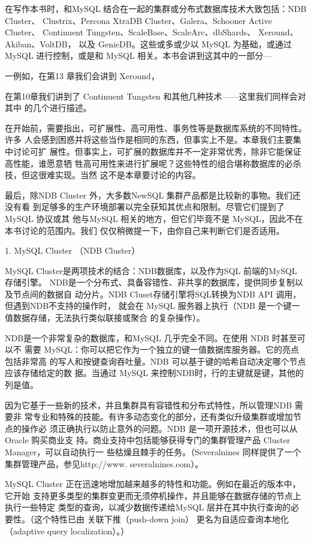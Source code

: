 在写作本书时，和MySQL 结合在一起的集群或分布式数据库技术大致包括：NDB
Cluster、 Clustrix、Percona XtraDB Cluster、Galera、Schooner Active Cluster、
Continuent Tungsten、ScaleBase、ScaleArc、dbShards、 Xeround、Akiban、VoltDB，
以及 GenieDB。这些或多或少以 MySQL 为基础，或通过MySQL 进行控制，或是和
MySQL 相关。本书会讲到这其中的一部分—

一例如，在第13 章我们会讲到 Xeround，

在第10章我们讲到了 Continuent Tungsten 和其他几种技术——这里我们同样会对其中
的几个进行描述。

在开始前，需要指出，可扩展性、高可用性、事务性等是数据库系统的不同特性。许多
人会感到困惑并将这些当作是相同的东西，但事实上不是。本章我们主要集中讨论可扩
展性。但事实上，可扩展的数据库并不一定非常优秀，除非它能保证高性能，谁愿意牺
牲高可用性来进行扩展呢？这些特性的组合堪称数据库的必杀技，但这很难实现。当然
这不是本章要讨论的内容。

最后，除NDB Cluster 外，大多数NewSQL 集群产品都是比较新的事物。我们还没有看
到足够多的生产环境部署以完全获知其优点和限制。尽管它们提到了 MySQL 协议或其
他与MySQL 相关的地方，但它们毕竟不是 MySQL，因此不在本书讨论的范围内。我们
仅仅稍微提一下，由你自己来判断它们是否适用。

1. MySQL Cluster （NDB Cluster）

MySQL Cluster是两项技术的结合：NDB数据库，以及作为SQL 前端的MySQL 存储引擎。
NDB是一个分布式、具备容错性、非共享的数据库，提供同步复制以及节点间的数据自
动分片。NDB Cluset存储引擎将SQL转换为NDB API 调用，但遇到NDB不支持的操作时，
就会在 MySQL 服务器上执行（NDB 是一个键一值数据存储，无法执行类似联接或聚合
的复杂操作）。

NDB是一个非常复杂的数据库，和MySQL 几乎完全不同。在使用 NDB 时甚至可以不
需要 MySQL：你可以把它作为一个独立的键一值数据库服务器。它的亮点包括非常高
的写人和按键查询吞吐量。NDB 可以基于键的哈希自动决定哪个节点应该存储给定的数
据。当通过 MySQL 来控制NDB时，行的主键就是键，其他的列是值。

因为它基于一些新的技术，并且集群具有容错性和分布式特性，所以管理NDB 需要非
常专业和特殊的技能。有许多动态变化的部分，还有类似升级集群或增加节点的操作必
须正确执行以防止意外的问题。NDB 是一项开源技术，但也可以从 Oracle 购买商业支
持。商业支持中包括能够获得专门的集群管理产品 Cluster Manager，可以自动执行一
些枯燥且棘手的任务。（Severalnines 同样提供了一个集群管理产品，参见http://www.
severalnines.com）。

MySQL Cluster 正在迅速地增加越来越多的特性和功能。例如在最近的版本中，它开始
支持更多类型的集群变更而无须停机操作，并且能够在数据存储的节点上执行一些特定
类型的查询，以减少数据传递给MySQL 层并在其中执行查询的必要性。（这个特性已由
关联下推（push-down join） 更名为自适应查询本地化（adaptive query localization）。）

